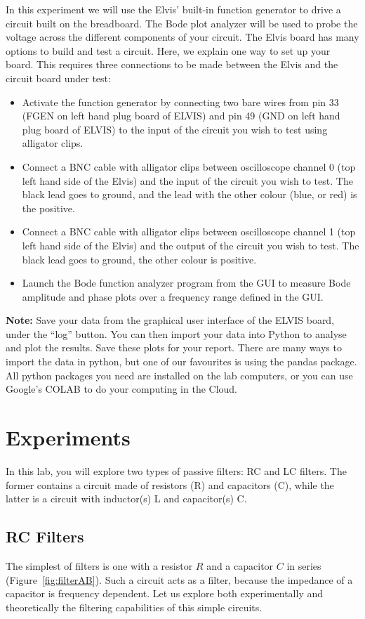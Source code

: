 \documentclass{article}
\begin{document}
In this experiment we will use the Elvis' built-in function generator
to drive a circuit built on the breadboard. The Bode plot analyzer
will be used to probe the voltage across the different components of
your circuit. The Elvis board has many options to build and test a
circuit. Here, we explain one way to set up your board. This requires
three connections to be made between the Elvis and the circuit board
under test:
\begin{itemize}
\item Activate the function generator by connecting two bare wires
  from pin 33 (FGEN on left hand plug board of ELVIS) and pin 49 (GND
  on left hand plug board of ELVIS) to the input of the circuit you
  wish to test using alligator clips.
\item Connect a BNC cable with alligator clips between oscilloscope
  channel 0 (top left hand side of the Elvis) and the input of the
  circuit you wish to test. The black lead goes to ground, and the
  lead with the other colour (blue, or red) is the positive.
\item Connect a BNC cable with alligator clips between
  oscilloscope channel 1 (top left hand side of the Elvis) and the
  output of the circuit you wish to test. The black lead goes to
  ground, the other colour is positive.
\item Launch the Bode function analyzer program from the GUI to
  measure Bode amplitude and phase plots over a frequency
  range defined in the GUI.
\end{itemize}

\noindent\textbf{Note:} Save
your data from the graphical user interface of the ELVIS board, under
the ``log'' button. You can then import your data into Python to
analyse and plot the results. Save these plots for your report. There
are many ways to import the data in python, but one of our favourites
is using the pandas package. All python packages you need are
installed on the lab computers, or you can use Google's COLAB to do
your computing in the Cloud.

\section*{Experiments}
In this lab, you will explore two types of passive filters: RC and LC
filters. The former contains a circuit made of resistors (R) and
capacitors (C), while the latter is a circuit with inductor(s) L and
capacitor(s) C. 

\subsection*{RC Filters}
The simplest of filters is one with a resistor $R$ and a capacitor $C$
in series (Figure~\ref{fig:filterAB}). Such a circuit acts as a
filter, because the impedance of a capacitor is frequency
dependent. Let us explore both experimentally and theoretically the
filtering capabilities of this simple circuits.
\end{document}
